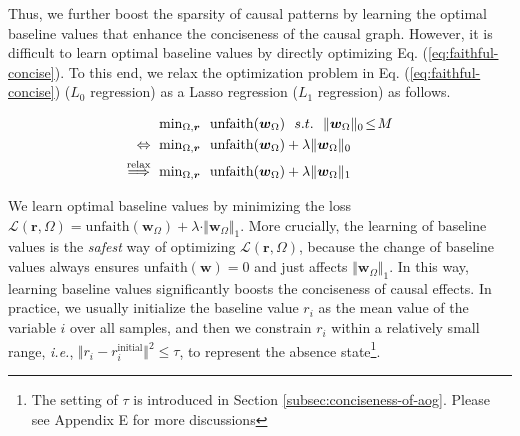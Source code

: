 \documentclass[10pt,twocolumn,letterpaper]{article}
\begin{document}
Thus, we further boost the sparsity of causal patterns by learning the optimal baseline values that enhance the conciseness of the causal graph.
However, it is difficult to learn optimal baseline values by directly optimizing Eq. (\ref{eq:faithful-concise}).
To this end, we relax the optimization problem in Eq. (\ref{eq:faithful-concise}) ({\small$L_0$} regression) as a Lasso regression ({\small$L_1$} regression) as follows.

\vspace{-3pt}
\begin{small}
\begin{equation}
\begin{aligned}
     {\min}_{\Omega,\boldsymbol{r}}\ \  &\mathrm{unfaith}(\boldsymbol{w}_{\Omega})
     \ \ 
     s.t.
     \ \ 
     \Vert\boldsymbol{w}_{\Omega}\Vert_0\!\leq\! M
     \\
     \Leftrightarrow
     \ 
     {\min}_{\Omega,\boldsymbol{r}}\ \  &\mathrm{unfaith}(\boldsymbol{w}_{\Omega}) + \lambda \Vert\boldsymbol{w}_{\Omega}\Vert_0
     \\
     \overset{\tiny\text{relax}}{\Longrightarrow}
     \ 
     {\min}_{\Omega,\boldsymbol{r}}\ \  &\mathrm{unfaith}(\boldsymbol{w}_{\Omega}) + \lambda \Vert\boldsymbol{w}_{\Omega}\Vert_1
\label{eq:faithful-concise-lasso}
\end{aligned}
\end{equation}
\end{small}

We learn optimal baseline values by minimizing the loss {\small$\mathcal{L}(\boldsymbol{r},\Omega) = \mathrm{unfaith}(\boldsymbol{w}_{\Omega}) + \lambda \cdot\Vert\boldsymbol{w}_{\Omega}\Vert_1$}.
More crucially, the learning of baseline values is the \textit{safest} way of optimizing {\small$\mathcal{L}(\boldsymbol{r},\Omega)$}, because the change of baseline values always ensures {\small$\mathrm{unfaith}(\boldsymbol{w})\!=\!0$} and just affects {\small$\Vert\boldsymbol{w}_{\Omega}\Vert_1$}. In this way, learning baseline values significantly boosts the conciseness of causal effects.
In practice, we usually initialize the baseline value {\small$r_i$} as the mean value of the variable {\small$i$} over all samples, and then we constrain {\small$r_i$} within a relatively small range, \emph{i.e.}, {\small$\Vert r_i\!-\!r_i^{\text{initial}}\Vert^2\!\leq\! \tau$}, to represent the absence state\footnote{The setting of {\small$\tau$} is introduced in Section \ref{subsec:conciseness-of-aog}. Please see Appendix E for more discussions}.
\end{document}
